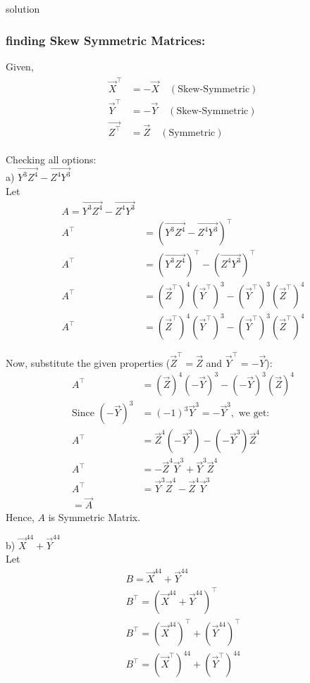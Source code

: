 \documentclass{beamer}
\begin{document}
\begin{frame}{solution}
\frametitle{finding Skew Symmetric Matrices:}
Given,
\begin{align}
\begin{aligned}\vec{X}^\top &= -\vec{X} \quad (\text{Skew-Symmetric}) \\\vec{Y}^\top &= -\vec{Y} \quad (\text{Skew-Symmetric}) \\\vec{Z^\top} &= \vec{Z} \quad (\text{Symmetric})\end{aligned}
\end{align}
\end{frame}
\begin{frame}
Checking all options:\\
a) $\vec{Y^3 Z^4} - \vec{Z^4 Y^3}$\\
Let 
\begin{align}
A = \vec{Y^3 Z^4} - \vec{Z^4 Y^3}\\
A^\top &= (\vec{Y^3 Z^4} - \vec{Z^4 Y^3})^\top \\
A^\top &= (\vec{Y^3 Z^4})^\top - (\vec{Z^4 Y^3})^\top \\
A^\top &= (\vec{Z}^\top)^4 (\vec{Y}^\top)^3 - (\vec{Y}^\top)^3 (\vec{Z}^\top)^4 \\
A^\top &= (\vec{Z}^\top)^4 (\vec{Y}^\top)^3 - (\vec{Y}^\top)^3 (\vec{Z}^\top)^4\end{align}
\end{frame}
\begin{frame}
Now, substitute the given properties ($\vec{Z}^\top= \vec{Z}$ and $\vec{Y}^\top = -\vec{Y}$):
\begin{align}A^\top &= (\vec{Z})^4 (-\vec{Y})^3 - (-\vec{Y})^3 (\vec{Z})^4 \\
\text{Since } (-\vec{Y})^3 &= (-1)^3 \vec{Y}^3 = -\vec{Y}^3, \text{ we get:} \\
A^\top &= \vec{Z}^4 (-\vec{Y}^3) - (-\vec{Y}^3) \vec{Z}^4 \\
A^\top &= -\vec{Z}^4 \vec{Y}^3 + \vec{Y}^3 \vec{Z}^4 \\
A^\top &= \vec{Y}^3 \vec{Z}^4 - \vec{Z}^4 \vec{Y}^3\\
=\vec{A}\end{align}
Hence, $A$ is Symmetric Matrix.
\end{frame}
\begin{frame}
b) $\vec{X}^{44} + \vec{Y}^{44}$\\
Let 
\begin{align}
B = \vec{X}^{44} + \vec{Y}^{44}\\
B^\top = (\vec{X}^{44} + \vec{Y}^{44})^\top \\
B^\top = (\vec{X}^{44})^\top + (\vec{Y}^{44})^\top \\
B^\top = (\vec{X}^\top)^{44} + (\vec{Y}^\top)^{44}
\end{align}
\end{frame}
\end{document}

